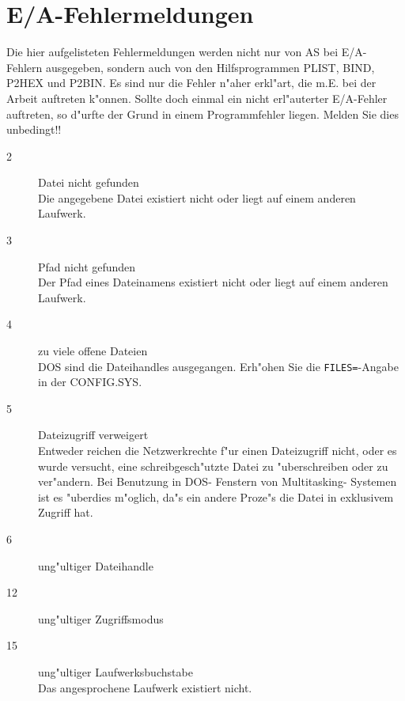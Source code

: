 \documentclass[12pt,a4paper,twoside]{report}
\newcommand{\tty}[1]{{\tt #1}}
\begin{document}

\cleardoublepage
\chapter{E/A-Fehlermeldungen}

Die hier aufgelisteten Fehlermeldungen werden nicht nur von AS bei E/A-
Fehlern ausgegeben, sondern auch von den Hilfsprogrammen PLIST, BIND,
P2HEX und P2BIN.  Es sind nur die Fehler n"aher erkl"art, die m.E. bei
der Arbeit auftreten k"onnen.  Sollte doch einmal ein nicht erl"auterter
E/A-Fehler auftreten, so d"urfte der Grund in einem Programmfehler
liegen.  Melden Sie dies unbedingt!!

\begin{description}
\item[2]{Datei nicht gefunden\\
         Die angegebene Datei existiert nicht oder liegt auf einem
         anderen Laufwerk.}

\item[3]{Pfad nicht gefunden\\
         Der Pfad eines Dateinamens existiert nicht oder liegt auf
         einem anderen Laufwerk.}

\item[4]{zu viele offene Dateien\\
         DOS sind die Dateihandles ausgegangen.  Erh"ohen Sie die
         \tty{FILES=}-Angabe in der CONFIG.SYS.}

\item[5]{Dateizugriff verweigert\\
         Entweder reichen die Netzwerkrechte f"ur einen Dateizugriff
         nicht, oder es wur\-de ver\-sucht, ei\-ne schreib\-ge\-sch"utz\-te Da\-tei
         zu "uber\-schrei\-ben oder zu ver\-"an\-dern.  Bei Benutzung in
         DOS- Fenstern von Multitasking- Systemen ist es "uberdies m"oglich,
         da"s ein andere Proze"s die Datei in exklusivem Zugriff hat.}

\item[6]{ung"ultiger Dateihandle}

\item[12]{ung"ultiger Zugriffsmodus}

\item[15]{ung"ultiger Laufwerksbuchstabe\\
          Das angesprochene Laufwerk existiert nicht.}



\end{description}
\end{document}
